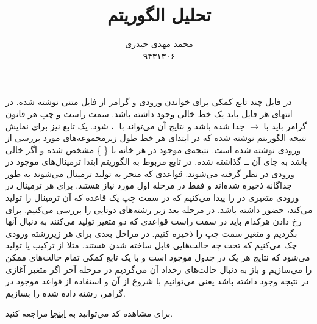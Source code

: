 \documentclass[a4paper]{article}
\title{تحلیل الگوریتم \lr{cyk}}
\author{محمد مهدی حیدری\\۹۴۳۱۳۰۶}
\begin{document}
	\maketitle
	در فایل 
	چند تابع کمکی برای خواندن ورودی و گرامر از فایل متنی نوشته شده. در انتهای هر فایل باید یک خط خالی وجود
	داشته باشد. سمت راست و چپ هر قانون گرامر باید با $\rightarrow$ جدا شده باشد و نتایج آن می‌تواند با $|$،
	شود. یک تابع نیز برای نمایش نتیجه الگوریتم نوشته شده که در ابتدای هر خط طول زیرمجموعه‌های مورد بررسی از 
	ورودی نوشته شده است. نتیجه‌ی موجود در هر خانه با 
	\{ \}
	 مشخص شده و اگر خالی باشد به جای آن ــ گذاشته شده.
	در تابع مربوط به الگوریتم ابتدا ترمینال‌های موجود در ورودی در نظر گرفته می‌شوند. قواعدی که منجر به تولید 
	ترمینال می‌شوند به طور جداگانه ذخیره شده‌اند و فقط در مرحله اول مورد نیاز هستند. برای هر ترمینال در ورودی
	متغیری در را پیدا می‌کنیم که در سمت چپ یک قاعده که آن ترمینال را تولید می‌کند، حضور داشته باشد. در مرحله بعد
	زیر رشته‌های دوتایی را بررسی می‌کنیم. برای رخ دادن هرکدام باید در سمت راست قواعدی که دو متغیر تولید می‌کنند
	 به دنبال آنها بگردیم و متغیر سمت چپ را ذخیره کنیم‌. در مراحل بعدی برای هر زیررشته ورودی چک می‌کنیم که تحت
	 چه حالت‌هایی قابل ساخته شدن هستند. مثلا 
	 از ترکیب
	 یا
	 تولید می‌شود که نتایج هر یک در جدول موجود است و با یک تابع کمکی تمام حالت‌های ممکن را می‌سازیم و باز به دنبال
	 حالت‌های رخداد آن می‌گردیم در مرحله آخر اگر متغیر آغازی در نتیجه وجود داشته باشد یعنی می‌توانیم با شروع از
	 آن و استفاده از قواعد موجود در گرامر، رشته داده شده را بسازیم.
	 \newpage
	 
	  \begin{latin}
	  	
	  \end{latin}
  	برای مشاهده کد می‌توانید به 
  	\href{https://github.com/mmheydari97/automata-cyk}{اینجا}
  	مراجعه کنید.
\end{document}
